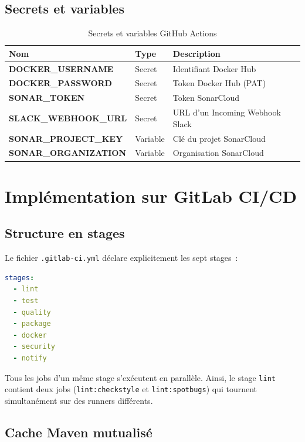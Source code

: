 \documentclass[12pt,a4paper]{report}
\begin{document}
\section{Secrets et variables}

\begin{table}[h!]
\centering
\small
\renewcommand{\arraystretch}{1.3}
\begin{tabular}{>{\bfseries}p{4.5cm} p{1.8cm} p{6cm}}
\toprule
Nom & Type & Description \\
\midrule
DOCKER\_USERNAME    & Secret   & Identifiant Docker Hub \\
DOCKER\_PASSWORD    & Secret   & Token Docker Hub (PAT) \\
SONAR\_TOKEN        & Secret   & Token SonarCloud \\
SLACK\_WEBHOOK\_URL & Secret   & URL d'un Incoming Webhook Slack \\
SONAR\_PROJECT\_KEY & Variable & Clé du projet SonarCloud \\
SONAR\_ORGANIZATION & Variable & Organisation SonarCloud \\
\bottomrule
\end{tabular}
\caption{Secrets et variables GitHub Actions}
\end{table}

\chapter{Implémentation sur GitLab CI/CD}
\label{ch:gitlab}

\section{Structure en stages}

Le fichier \texttt{.gitlab-ci.yml} déclare explicitement les sept stages~:

\begin{lstlisting}[language=YAML, caption={Stages GitLab}]
stages:
  - lint
  - test
  - quality
  - package
  - docker
  - security
  - notify
\end{lstlisting}

Tous les jobs d'un même stage s'exécutent en parallèle. Ainsi, le stage
\texttt{lint} contient deux jobs (\texttt{lint:checkstyle} et
\texttt{lint:spotbugs}) qui tournent simultanément sur des runners différents.

\section{Cache Maven mutualisé}
\end{document}
